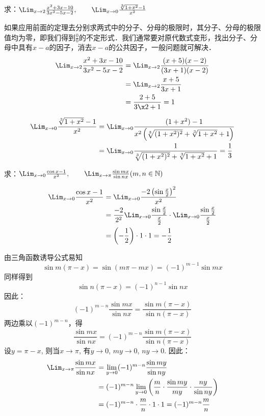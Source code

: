 \begin{example}
求：$\Lim_{x\to 2}\frac{x^2+3x-10}{3x^2-5x-2},\qquad \Lim_{x\to 0}\frac{\sqrt[3]{1+x^2}-1}{x^2}$
\end{example}

\begin{solution}
    如果应用前面的定理去分别求两式中的分子、分母的极限时，其分子、分母的极限值均为零，即我们得到$\frac{0}{0}$的不定形式．我们通常要对原代数式变形，找出分子、分母中具有$x-a$的因子，消去$x-a$的公共因子，一般问题就可解决．
\[\begin{split}
    \Lim_{x\to 2}\frac{x^2+3x-10}{3x^2-5x-2}&=\Lim_{x\to 2}\frac{(x+5)(x-2)}{(3x+1)(x-2)}\\
    &=\Lim_{x\to 2}\frac{x+5}{3x+1}\\
    &=\frac{2+5}{3\x 2+1}=1
\end{split}\]

\[\begin{split}
    \Lim_{x\to 0}\frac{\sqrt[3]{1+x^2}-1}{x^2}&=\Lim_{x\to 0}\frac{{(1+x^2)}-1}{x^2\left(\sqrt[3]{(1+x^2)^2}+\sqrt[3]{1+x^2}+1\right)}\\
    &=\Lim_{x\to 0}\frac{1}{\sqrt[3]{(1+x^2)^2}+\sqrt[3]{1+x^2}+1}=\frac{1}{3}
\end{split}\]
\end{solution}

\begin{example}
    求：$\Lim_{x\to 0}\frac{\cos x-1}{x^2},\qquad \Lim_{x\to \pi}\frac{\sin mx}{\sin nx}(m,n\in \mathbb{N})$
\end{example}

\begin{solution}
\[\begin{split}
    \Lim_{x\to 0}\frac{\cos x-1}{x^2}&=\Lim_{x\to 0}\frac{-2\left(\sin\frac{x}{2}\right)^2}{x^2}\\
    &=\frac{-2}{2^2}\Lim_{x\to 0}\frac{\sin\frac{x}{2}}{\frac{x}{2}}\cdot \Lim_{x\to 0}\frac{\sin\frac{x}{2}}{\frac{x}{2}}\\
    &=\left(-\frac{1}{2}\right)\cdot 1\cdot 1=-\frac{1}{2}
\end{split}\]

由三角函数诱导公式易知
\[\sin m(\pi-x)=\sin(m\pi-mx)=(-1)^{m-1}\sin mx\]
同样得到
\[\sin n(\pi-x)=(-1)^{n-1}\sin nx\]
因此：
\[(-1)^{m-n}\frac{\sin mx}{\sin nx}=\frac{\sin m(\pi-x)}{\sin n(\pi-x)}\]
两边乘以$(-1)^{m-n}$，得
\[\frac{\sin mx}{\sin nx}=(-1)^{m-n}\frac{\sin m(\pi-x)}{\sin n(\pi-x)}\]
设$y=\pi-x$, 则当$x\to \pi$, 有$y\to 0$, $my\to 0$, $ny\to 0$. 因此：
\[\begin{split}
    \Lim_{x\to \pi}\frac{\sin mx}{\sin nx}&=\lim_{y\to 0}(-1)^{m-n}\frac{\sin my}{\sin ny}\\
&=(-1)^{m-n}\lim_{y\to 0}\left(\frac{m}{n}\cdot \frac{\sin my}{my}\cdot \frac{ny}{\sin ny}\right)\\
&=(-1)^{m-n}\cdot \frac{m}{n}\cdot 1\cdot 1=(-1)^{m-n}\frac{m}{n}
\end{split}\]
\end{solution}

